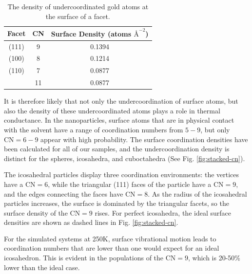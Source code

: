 \begin{table}[h]
\centering
\caption{The density of undercoordinated gold atoms at the surface of a facet.  
\label{tab:au-den}}
\renewcommand*{\arraystretch}{2}
\begin{tabular}{ ccc }
\toprule
Facet & CN & Surface Density (atoms $\text{\AA}^{-2}$)\\
\midrule
        (111) & 9  & 0.1394 \\
\midrule
        (100) & 8  & 0.1214 \\
\midrule
        (110) & 7  & 0.0877 \\
              & 11 & 0.0877 \\
\bottomrule
\end{tabular}
\end{table}

It is therefore likely that not only the undercoordination of surface
atoms, but also the density of these undercoordinated atoms plays a
role in thermal conductance. In the nanoparticles, surface atoms that
are in physical contact with the solvent have a range of coordination
numbers from $5 - 9$, but only $\text{CN} = 6 - 9$ appear with high
probability.  The surface coordination densities have been calculated
for all of our samples, and the undercoordination density is distinct
for the spheres, icosahedra, and cuboctahedra (See
Fig. \ref{fig:stacked-cn}).

The icosahedral particles display three coordination environments: the
vertices have a $\text{CN} = 6$, while the triangular (111) faces of
the particle have a $\text{CN} = 9$, and the edges connecting the
faces have $\text{CN} = 8$.  As the radius of the icosahedral
particles increases, the surface is dominated by the triangular
facets, so the surface density of the $\text{CN} = 9$ rises.  For
perfect icosahedra, the ideal surface densities are shown as dashed
lines in Fig. \ref{fig:stacked-cn}.

For the simulated systems at 250K, surface vibrational motion leads to
coordination numbers that are lower than one would expect for an ideal
icosahedron. This is evident in the populations of the $\text{CN}= 9$,
which is 20-50\% lower than the ideal case.

